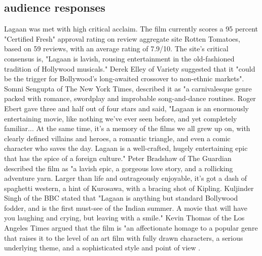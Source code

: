 \documentclass[a4paper]{article}
\begin{document}
	\subsection{audience responses}	            
	Lagaan was met with high critical acclaim. The film currently scores a 95 percent "Certified Fresh" approval rating on review aggregate site Rotten Tomatoes, based on 59 reviews, with an average rating of 7.9/10. The site's critical consensus is, "Lagaan is lavish, rousing entertainment in the old-fashioned tradition of Hollywood musicals." Derek Elley of Variety suggested that it "could be the trigger for Bollywood's long-awaited crossover to non-ethnic markets". Somni Sengupta of The New York Times, described it as "a carnivalesque genre packed with romance, swordplay and improbable song-and-dance routines. Roger Ebert gave three and half out of four stars and said, "Lagaan is an enormously entertaining movie, like nothing we've ever seen before, and yet completely familiar... At the same time, it's a memory of the films we all grew up on, with clearly defined villains and heroes, a romantic triangle, and even a comic character who saves the day. Lagaan is a well-crafted, hugely entertaining epic that has the spice of a foreign culture." Peter Bradshaw of The Guardian described the film as "a lavish epic, a gorgeous love story, and a rollicking adventure yarn. Larger than life and outrageously enjoyable, it's got a dash of spaghetti western, a hint of Kurosawa, with a bracing shot of Kipling. Kuljinder Singh of the BBC stated that "Lagaan is anything but standard Bollywood fodder, and is the first must-see of the Indian summer. A movie that will have you laughing and crying, but leaving with a smile." Kevin Thomas of the Los Angeles Times argued that the film is "an affectionate homage to a popular genre that raises it to the level of an art film with fully drawn characters, a serious underlying theme, and a sophisticated style and point of view .       
	     
	    
	

	
	
\end{document}
